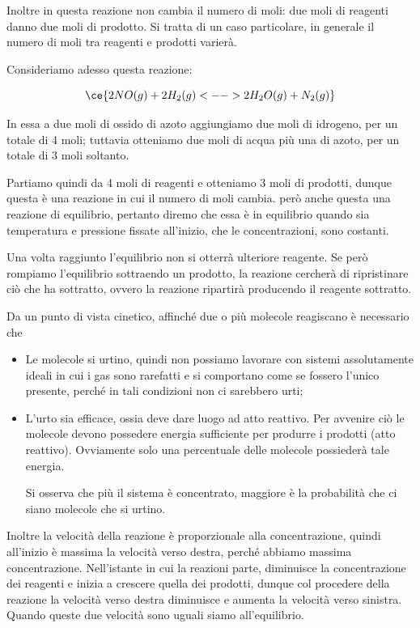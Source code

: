 Inoltre in questa reazione non cambia il numero di moli: due moli di reagenti danno due moli di prodotto. Si tratta di un caso particolare, in generale il numero di moli tra reagenti e prodotti varierà.

\vspace{0.2cm}Consideriamo adesso questa reazione:

$$\ce{2NO(g) + 2H_2(g) <--> 2H_2O(g) + N_2(g)}$$

In essa a due moli di ossido di azoto aggiungiamo due moli di idrogeno, per un totale di 4 moli; tuttavia otteniamo due moli di acqua più una di azoto, per un totale di 3 moli soltanto.

Partiamo quindi da 4 moli di reagenti e otteniamo 3 moli di prodotti, dunque questa è una reazione in cui il numero di moli cambia. \E però anche questa una reazione di equilibrio, pertanto diremo che essa è in equilibrio quando sia temperatura e pressione fissate all'inizio, che le concentrazioni, sono costanti.

Una volta raggiunto l'equilibrio non si otterrà ulteriore reagente. Se però rompiamo l'equilibrio sottraendo un prodotto, la reazione cercherà di ripristinare ciò che ha sottratto, ovvero la reazione ripartirà producendo il reagente sottratto.

\vspace{0.2cm}Da un punto di vista cinetico, affinché due o più molecole reagiscano è necessario che

\begin{itemize}
    \item Le molecole si urtino, quindi non possiamo lavorare con sistemi assolutamente ideali in cui i gas sono rarefatti e si comportano come se fossero l'unico presente, perché in tali condizioni non ci sarebbero urti;
    \item L'urto sia efficace, ossia deve dare luogo ad atto reattivo. Per avvenire ciò le molecole devono possedere energia sufficiente per produrre i prodotti (atto reattivo). Ovviamente solo una percentuale delle molecole possiederà tale energia.

    Si osserva che più il sistema è concentrato, maggiore è la probabilità che ci siano molecole che si urtino.
\end{itemize}

Inoltre la velocità della reazione è proporzionale alla concentrazione, quindi all'inizio è massima la velocità verso destra, perché abbiamo massima concentrazione. Nell'istante in cui la reazioni parte, diminuisce la concentrazione dei reagenti e inizia a crescere quella dei prodotti, dunque col procedere della reazione la velocità verso destra diminuisce e aumenta la velocità verso sinistra. Quando queste due velocità sono uguali siamo all'equilibrio.
